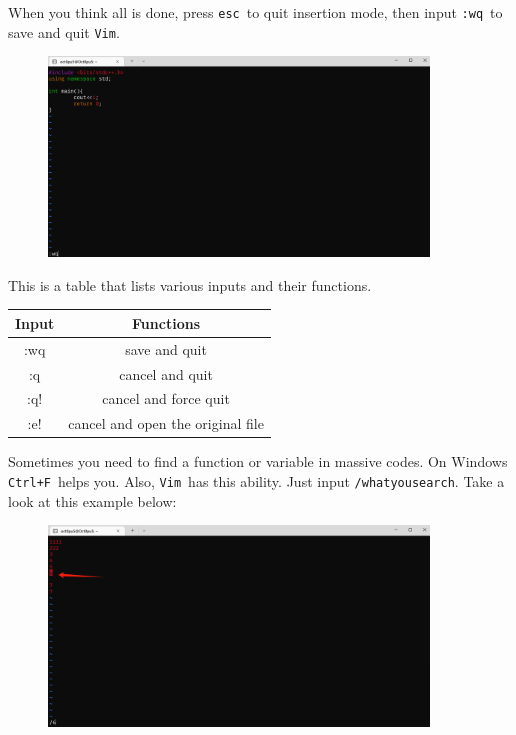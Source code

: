 \documentclass[12pt]{ctexart}
\begin{document}
When you think all is done, press \texttt{esc}\ to quit insertion mode,
then input \texttt{:wq}\ to save and quit \texttt{Vim}.

\begin{figure}[H]
    \centering
    \includegraphics[width=0.9\textwidth,keepaspectratio]{assets/Linux/1.3 How to edit files on Linux/3.png}
\end{figure}

This is a table that lists various inputs and their functions.

\begin{table}[H]
    \centering
    \begin{tabular}{cc}
    \toprule
    Input & Functions \\
    \midrule
    :wq & save and quit \\
    :q & cancel and quit \\
    :q! & cancel and force quit \\
    :e! & cancel and open the original file \\
    \bottomrule
    \end{tabular}
\end{table}

Sometimes you need to find a function or variable in massive codes. On
Windows \texttt{Ctrl+F}\ helps you. Also, \texttt{Vim}\ has this ability.
Just input \texttt{/whatyousearch}. Take a look at this example below:

\begin{figure}[H]
    \centering
    \includegraphics[width=0.9\textwidth,keepaspectratio]{assets/Linux/1.3 How to edit files on Linux/4.png}
\end{figure}
\end{document}
